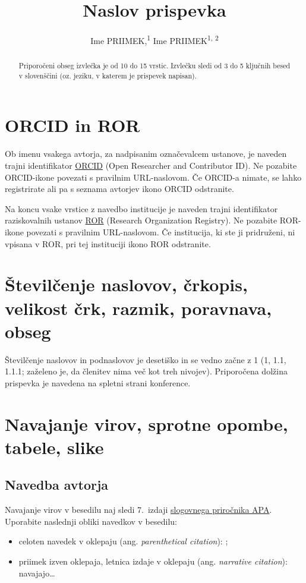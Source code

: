 \documentclass{article}
\title{Naslov prispevka}
\author{
  Ime PRIIMEK,\textsuperscript{1}\orcidlink{0000-0000-0000-0000} Ime PRIIMEK\textsuperscript{1, 2}\orcidlink{0000-0000-0000-0001}
}
\begin{document}
\maketitle

\begin{abstract}
Priporočeni obseg izvlečka je od 10 do 15 vrstic. Izvlečku sledi od 3 do 5 ključnih besed v slovenščini (oz. jeziku, v katerem je prispevek napisan).
\end{abstract}

\section{ORCID in ROR}

Ob imenu vsakega avtorja, za nadpisanim označevalcem ustanove, je naveden trajni identifikator \href{https://orcid.org/}{ORCID} (Open Researcher and Contributor ID). Ne pozabite ORCID-ikone povezati s pravilnim URL-naslovom. Če ORCID-a nimate, se lahko registrirate ali pa s seznama avtorjev ikono ORCID odstranite.

Na koncu vsake vrstice z navedbo institucije je naveden trajni identifikator raziskovalnih ustanov \href{https://ror.org/}{ROR} (Research Organization Registry). Ne pozabite ROR-ikone povezati s pravilnim URL-naslovom. Če institucija, ki ste ji pridruženi, ni vpisana v ROR, pri tej instituciji ikono ROR odstranite.

\section{Številčenje naslovov, črkopis, velikost črk, razmik, poravnava, obseg}

Številčenje naslovov in podnaslovov je desetiško in se vedno začne z 1 (1, 1.1, 1.1.1; zaželeno je, da členitev nima več kot treh nivojev). Priporočena dolžina prispevka je navedena na spletni strani konference.

\section{Navajanje virov, sprotne opombe, tabele, slike}

\subsection{Navedba avtorja}

Navajanje virov v besedilu naj sledi 7.\ izdaji \href{https://apastyle.apa.org/}{slogovnega priročnika APA}. 
Uporabite naslednji obliki navedkov v besedilu:
\begin{itemize}
    \item celoten navedek v oklepaju (ang. \textit{parenthetical citation}): \parencite{leech1992corpora};
    \item priimek izven oklepaja, letnica izdaje v oklepaju (ang. \textit{narrative citation}): \textcite{biber1998corpus} navajajo\ldots{}
\end{itemize}
 
\end{document}
